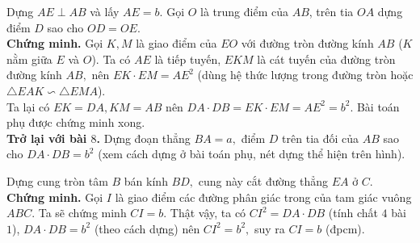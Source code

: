 \begin{bt}
{Dựng $AE \perp AB$ và lấy $AE=b$. Gọi $O$ là trung điểm của $AB$, trên tia $OA$ dựng điểm $D$ sao cho $OD=OE.$\\
\textbf{Chứng minh.} Gọi $K, M$ là giao điểm của $EO$ với đường tròn đường kính $AB$ ($K$ nằm giữa $E$ và $O$).
Ta có $AE$ là tiếp tuyến, $EKM$ là cát tuyến của đường tròn đường kính $AB,$ nên $EK \cdot EM = AE^2$ (dùng hệ thức lượng trong đường tròn hoặc $\triangle EAK \backsim \triangle EMA$). \\
Ta lại có $EK=DA, KM=AB$ nên $DA \cdot DB = EK \cdot EM = AE^2 = b^2.$ Bài toán phụ được chứng minh xong.\\
\textbf{Trở lại với bài $8$.}	Dựng đoạn thẳng $BA=a,$ điểm $D$ trên tia đối của $AB$ sao cho $DA \cdot DB = b^2$ (xem cách dựng ở bài toán phụ, nét dựng thể hiện trên hình).
\begin{center}
\end{center}
Dựng cung tròn tâm $B$ bán kính $BD,$ cung này cắt đường thẳng $EA$ ở $C.$\\
\textbf{Chứng minh.} Gọi $I$ là giao điểm các đường phân giác trong của tam giác vuông $ABC.$ Ta sẽ chứng minh $CI=b.$ Thật vậy, ta có $CI^2=DA \cdot DB$ (tính chất $4$ bài $1$), $DA \cdot DB = b^2$ (theo cách dựng) nên $CI^2=b^2,$ suy ra $CI=b$ (đpcm).
}
\end{bt}
